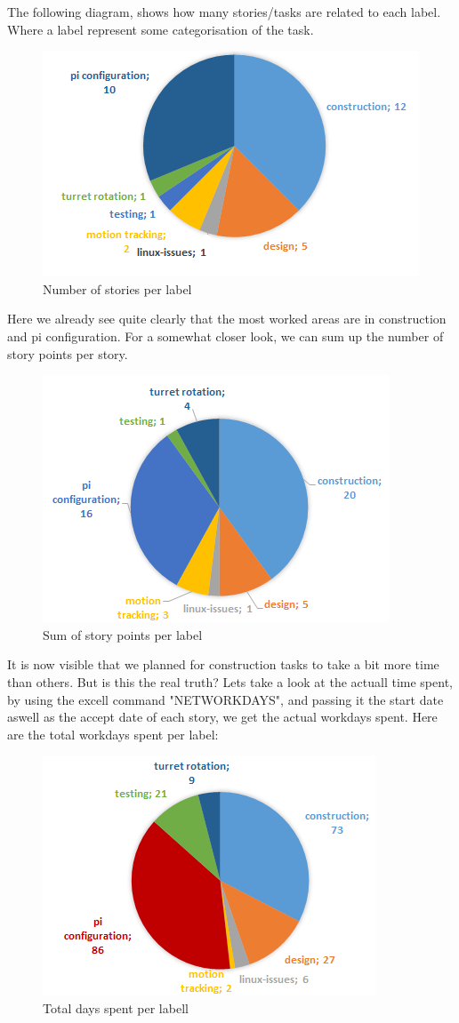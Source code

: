 \documentclass{article}
\begin{document}
The following diagram, shows how many stories/tasks are related to each label.
Where a label represent some categorisation of the task.
\begin{figure}[H]
\center
\includegraphics{nStories.png}
\caption{Number of stories per label}
\end{figure}
Here we already see quite clearly that the most worked areas are in construction and pi configuration.
For a somewhat closer look, we can sum up the number of story points per story.
\begin{figure}[H]
\center
\includegraphics{nPoints.png}
\caption{Sum of story points per label}
\end{figure}
It is now visible that we planned for construction tasks to take a bit more time than others.
But is this the real truth?
Lets take a look at the actuall time spent, by using the excell command "NETWORKDAYS", and passing it the start date aswell as the accept date of each story, we get the actual workdays spent.
\clearpage
Here are the total workdays spent per label:

\begin{figure}[H]
\center
\includegraphics{daysSpent.png}
\caption{Total days spent per labell}
\end{figure}
\end{document}

